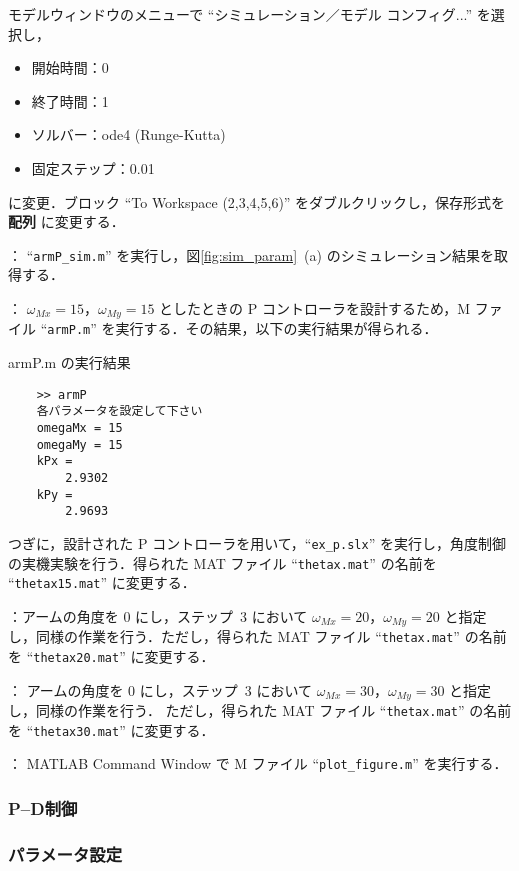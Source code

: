 \noindent
モデルウィンドウのメニューで ``シミュレーション／モデル コンフィグ...'' を選択し，
\begin{itemize}
  \item 開始時間：0
  \item 終了時間：1
  \item ソルバー：ode4 (Runge-Kutta)
  \item 固定ステップ：0.01
\end{itemize}
に変更．ブロック ``To Workspace (2,3,4,5,6)'' をダブルクリックし，保存形式を \textbf{配列} に変更する．

： ``\texttt{armP\_sim.m}'' を実行し，図\ref{fig:sim_param}~(a) のシミュレーション結果を取得する．

：
$\omega_{Mx} = 15$，$\omega_{My} = 15$ としたときの P コントローラを設計するため，M ファイル ``\texttt{armP.m}'' を実行する．その結果，以下の実行結果が得られる．
\newpage

{armP.m} の実行結果
    \begin{verbatim}
    >> armP
    各パラメータを設定して下さい
    omegaMx = 15
    omegaMy = 15
    kPx = 
        2.9302
    kPy = 
        2.9693
    \end{verbatim}
\noindent
つぎに，設計された P コントローラを用いて，``\texttt{ex\_p.slx}'' を実行し，角度制御の実機実験を行う．得られた MAT ファイル ``\texttt{thetax.mat}'' の名前を ``\texttt{thetax15.mat}'' に変更する．

：アームの角度を 0 にし，ステップ~3 において $\omega_{Mx} = 20$，$\omega_{My} = 20$ と指定し，同様の作業を行う．ただし，得られた MAT ファイル “\texttt{thetax.mat}” の名前を “\texttt{thetax20.mat}” に変更する．

：
アームの角度を 0 にし，ステップ~3 において $\omega_{Mx} = 30$，$\omega_{My} = 30$ と指定し，同様の作業を行う．
ただし，得られた MAT ファイル “\texttt{thetax.mat}” の名前を “\texttt{thetax30.mat}” に変更する．

：
MATLAB Command Window で M ファイル ``\texttt{plot\_figure.m}'' を実行する．

\subsubsection{P--D制御}
\subsubsection{パラメータ設定}

